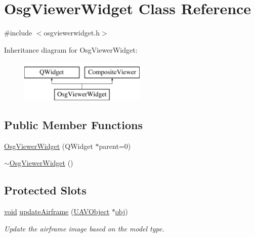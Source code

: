\hypertarget{class_osg_viewer_widget}{\section{Osg\-Viewer\-Widget Class Reference}
\label{class_osg_viewer_widget}
}


{\ttfamily \#include $<$osgviewerwidget.\-h$>$}

Inheritance diagram for Osg\-Viewer\-Widget\-:\begin{figure}[H]
\begin{center}
\leavevmode
\includegraphics[height=2.000000cm]{class_osg_viewer_widget}
\end{center}
\end{figure}
\subsection*{Public Member Functions}
\begin{DoxyCompactItemize}
\item 
\hyperlink{class_osg_viewer_widget_a24ee315fe42989ffd8c20d4bb457537b}{Osg\-Viewer\-Widget} (Q\-Widget $\ast$parent=0)
\item 
\hyperlink{class_osg_viewer_widget_a6365239e14d9ef063931d419640fc184}{$\sim$\-Osg\-Viewer\-Widget} ()
\end{DoxyCompactItemize}
\subsection*{Protected Slots}
\begin{DoxyCompactItemize}
\item 
\hyperlink{group___u_a_v_objects_plugin_ga444cf2ff3f0ecbe028adce838d373f5c}{void} \hyperlink{class_osg_viewer_widget_adcfd8d4429bc27110d678b34bf88b695}{update\-Airframe} (\hyperlink{class_u_a_v_object}{U\-A\-V\-Object} $\ast$\hyperlink{glext_8h_a0c0d4701a6c89f4f7f0640715d27ab26}{obj})
\begin{DoxyCompactList}\small\item\em Update the airframe image based on the model type. \end{DoxyCompactList}\end{DoxyCompactItemize}
